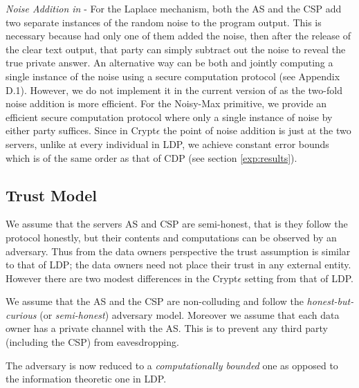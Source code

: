  \textit{Noise Addition in \system} - For the Laplace mechanism, both the \textsf{AS} and the \textsf{CSP} add two separate instances of the random noise to the program output. This is necessary because had only one of them added the noise, then after the release of the clear text output, that party can simply subtract out the noise to reveal the true private answer. An alternative way can be both \AS and \CSP jointly computing a single instance of the noise using a secure computation protocol (see Appendix D.1). However, we do not implement it in the current version of \system as the two-fold noise addition is more efficient. For the Noisy-Max primitive, we provide an efficient secure computation protocol where only a single instance of noise by either party suffices. 
Since in Crypt$\epsilon$ the point of noise addition is just at the two servers, unlike at every individual in \textsf{LDP}, we achieve constant error bounds which is of the same order as that of \textsf{CDP} (see section \ref{exp:results}). 
 






\subsection{Trust Model}\label{sec:trust}
We assume that the servers \textsf{AS} and \textsf{CSP} are semi-honest, that is they follow the protocol honestly, but their contents and computations can be observed by an adversary. 
Thus from the data owners perspective the trust assumption is similar to that of \textsf{LDP}; the data owners need not place their trust in any external entity. 
However there are two modest differences in the Crypt$\epsilon$ setting from that of \textsf{LDP}.
\squishlist
\item We assume that the \textsf{AS} and the \textsf{CSP} are non-colluding and follow the \emph{honest-but-curious} (or \textit{semi-honest}) adversary model. %
 Moreover we assume that each data owner has a private channel with the \textsf{AS}. This is to prevent any third party (including the \textsf{CSP}) from eavesdropping. \\
\item The adversary is now reduced to a \textit{computationally bounded} one as opposed to the information theoretic one  in \textsf{LDP}.
 \squishend


